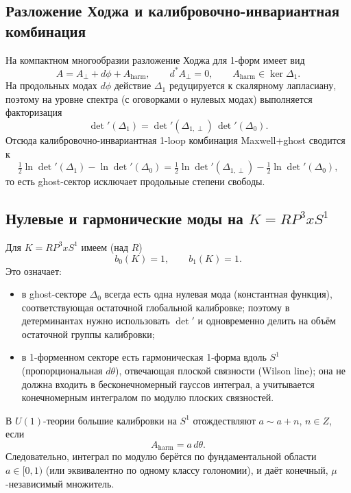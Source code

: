 \documentclass[12pt]{article}
\def\mathbb#1{#1}%
\def\times{x}%
\begin{document}
\subsection{Разложение Ходжа и калибровочно-инвариантная комбинация}
На компактном многообразии разложение Ходжа для 1-форм имеет вид
\begin{equation}
  A=A_{\perp}+d\phi + A_{\mathrm{harm}},
  \qquad d^{\ast}A_{\perp}=0,
  \qquad A_{\mathrm{harm}}\in\ker \Delta_1.
\end{equation}
На продольных модах $d\phi$ действие $\Delta_1$ редуцируется к скалярному лапласиану, поэтому на уровне спектра (с оговорками о нулевых модах) выполняется факторизация
\begin{equation}
  \det'(\Delta_1)=\det'(\Delta_{1,\perp})\,\det'(\Delta_0).
\end{equation}
Отсюда калибровочно-инвариантная 1-loop комбинация Maxwell+ghost сводится к
\begin{equation}
  \tfrac12\ln\det'(\Delta_1)-\ln\det'(\Delta_0)
  =\tfrac12\ln\det'(\Delta_{1,\perp})-\tfrac12\ln\det'(\Delta_0),
\end{equation}
то есть ghost-сектор исключает продольные степени свободы.

\subsection{Нулевые и гармонические моды на $K=\mathbb{RP}^3\times S^1$}
Для $K=\mathbb{RP}^3\times S^1$ имеем (над $\mathbb{R}$)
\begin{equation}
  b_0(K)=1,\qquad b_1(K)=1.
\end{equation}
Это означает:
\begin{itemize}
  \item в ghost-секторе $\Delta_0$ всегда есть одна нулевая мода (константная функция), соответствующая остаточной глобальной калибровке; поэтому в детерминантах нужно использовать $\det'$ и одновременно делить на объём остаточной группы калибровки;
  \item в 1-форменном секторе есть гармоническая 1-форма вдоль $S^1$ (пропорциональная $d\theta$), отвечающая плоской связности (Wilson line); она не должна входить в бесконечномерный гауссов интеграл, а учитывается конечномерным интегралом по модулю плоских связностей.
\end{itemize}
В $U(1)$-теории большие калибровки на $S^1$ отождествляют $a\sim a+n$, $n\in\mathbb{Z}$, если
\begin{equation}
  A_{\mathrm{harm}}=a\,d\theta.
\end{equation}
Следовательно, интеграл по модулю берётся по фундаментальной области $a\in[0,1)$ (или эквивалентно по одному классу голономии), и даёт конечный, $\mu$-независимый множитель.
\end{document}
